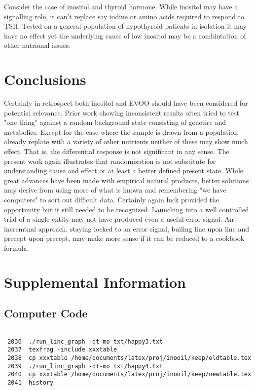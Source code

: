 Consider the case of inositol and thyroid hormone. While inositol
may have a signalling role, it can't replace say iodine or amino
acids required to respond to TSH.  Tested on a general population
of hypothyroid patients in isolation it may have no effect yet
the underlying cause of low inositol may be a combintation
of other nutrional issues.  






\section{Conclusions}
Certainly in retrospect both inositol and EVOO should have been 
considered for potential relevance. Prior work showing inconsistent
results often tried to test "one thing" against a random background
state consisting of genetirc and metabolics. Except for the case where
the sample is drawn from a population already replate with a variety
of other nutrients neither of these may show much effect. That is, the
differential response is not significant in any sense. The present work
again illustrates that randomization is not substitute for understanding
cause and effect or at least a better defined present state. While great 
advances have been made with empirical natural products, better solutions
may derive from using more of what is known and remembering "we have 
computers" to sort out difficult data. 
Certainly again luck provided the opportunity but it still needed
to be recognized.  Launching into a well controlled trial of a single
entity may not have produced even a useful error signal.
An incremtnal approach. staying locked to an error signal, builing
line upon line and precept upon precept, may make more sense
if it can be reduced to a cookbook formula.
 


\section{Supplemental Information}

\subsection{Computer Code}


\begin{lstlisting}

 2036  ./run_linc_graph -dt-mo txt/happy3.txt 
 2037  texfrag -include xxxtable 
 2038  cp xxxtable /home/documents/latex/proj/inooil/keep/oldtable.tex
 2039  ./run_linc_graph -dt-mo txt/happy4.txt 
 2040  cp xxxtable /home/documents/latex/proj/inooil/keep/newtable.tex
 2041  history


\end{lstlisting}
